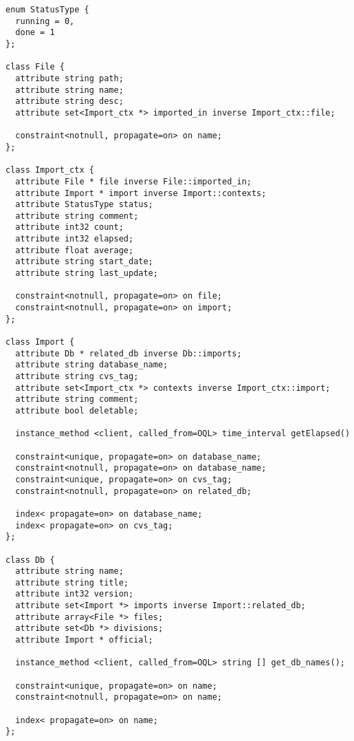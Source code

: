 \begin{verbatim}
enum StatusType {
  running = 0,
  done = 1
};

class File {
  attribute string path;
  attribute string name;
  attribute string desc;
  attribute set<Import_ctx *> imported_in inverse Import_ctx::file;

  constraint<notnull, propagate=on> on name;
};

class Import_ctx {
  attribute File * file inverse File::imported_in;
  attribute Import * import inverse Import::contexts;
  attribute StatusType status;
  attribute string comment;
  attribute int32 count;
  attribute int32 elapsed;
  attribute float average;
  attribute string start_date;
  attribute string last_update;

  constraint<notnull, propagate=on> on file;
  constraint<notnull, propagate=on> on import;
};

class Import {
  attribute Db * related_db inverse Db::imports;
  attribute string database_name;
  attribute string cvs_tag;
  attribute set<Import_ctx *> contexts inverse Import_ctx::import;
  attribute string comment;
  attribute bool deletable;

  instance_method <client, called_from=OQL> time_interval getElapsed()

  constraint<unique, propagate=on> on database_name;
  constraint<notnull, propagate=on> on database_name;
  constraint<unique, propagate=on> on cvs_tag;
  constraint<notnull, propagate=on> on related_db;

  index< propagate=on> on database_name;
  index< propagate=on> on cvs_tag;
};

class Db {
  attribute string name;
  attribute string title;
  attribute int32 version;
  attribute set<Import *> imports inverse Import::related_db;
  attribute array<File *> files;
  attribute set<Db *> divisions;
  attribute Import * official;

  instance_method <client, called_from=OQL> string [] get_db_names();

  constraint<unique, propagate=on> on name;
  constraint<notnull, propagate=on> on name;

  index< propagate=on> on name;
};
\end{verbatim}
\newpage
{}
